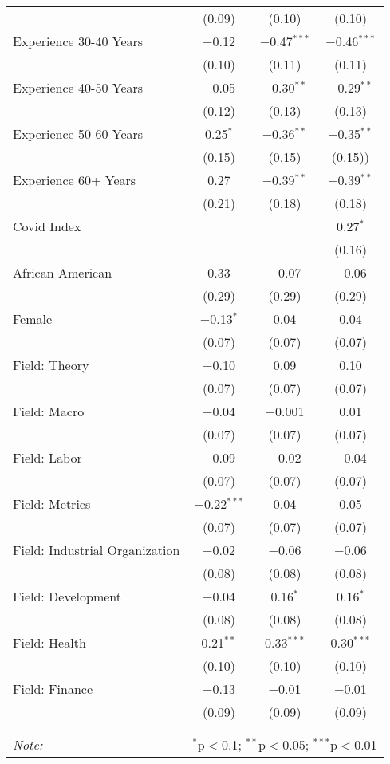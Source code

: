 \begin{table}[!htbp]
\begin{tabular}{lccc}
  & (0.09) & (0.10) & (0.10) \\
  Experience 30-40 Years & $-$0.12 & $-$0.47$^{***}$ & $-$0.46$^{***}$ \\ 
  & (0.10) & (0.11) & (0.11) \\
  Experience 40-50 Years & $-$0.05 & $-$0.30$^{**}$ & $-$0.29$^{**}$ \\ 
  & (0.12) & (0.13) & (0.13) \\
  Experience 50-60 Years & 0.25$^{*}$ & $-$0.36$^{**}$ & $-$0.35$^{**}$ \\ 
  & (0.15) & (0.15) & (0.15)) \\
  Experience 60+ Years & 0.27 & $-$0.39$^{**}$ & $-$0.39$^{**}$  \\ 
  & (0.21) & (0.18) & (0.18) \\
  Covid Index &  &  & 0.27$^{*}$ \\ 
  &  &  & (0.16) \\
  African American & 0.33 & $-$0.07 & $-$0.06 \\ 
  & (0.29) & (0.29) & (0.29) \\
  Female & $-$0.13$^{*}$ & 0.04 & 0.04 \\ 
  & (0.07) & (0.07) & (0.07) \\
  Field: Theory & $-$0.10 & 0.09 & 0.10 \\ 
  & (0.07) & (0.07) & (0.07) \\
  Field: Macro & $-$0.04 & $-$0.001 & 0.01 \\ 
  & (0.07) & (0.07) & (0.07) \\
  Field: Labor & $-$0.09 & $-$0.02 & $-$0.04 \\ 
  & (0.07) & (0.07) & (0.07) \\
  Field: Metrics & $-$0.22$^{***}$ & 0.04 & 0.05 \\ 
  & (0.07) & (0.07) & (0.07) \\
  Field: Industrial Organization & $-$0.02 & $-$0.06 & $-$0.06 \\ 
  & (0.08) & (0.08) & (0.08) \\
  Field: Development & $-$0.04 & 0.16$^{*}$ & 0.16$^{*}$ \\ 
  & (0.08) & (0.08) & (0.08) \\
  Field: Health & 0.21$^{**}$ & 0.33$^{***}$ & 0.30$^{***}$ \\ 
  & (0.10) & (0.10) & (0.10) \\
  Field: Finance & $-$0.13 & $-$0.01 & $-$0.01 \\ 
  & (0.09) & (0.09) & (0.09) \\
 \hline \\[-1.8ex] 
\hline \\[-1.8ex] 
\textit{Note:}  & \multicolumn{3}{r}{$^{*}$p$<$0.1; $^{**}$p$<$0.05; $^{***}$p$<$0.01} \\ 
\end{tabular}
\end{table} 

